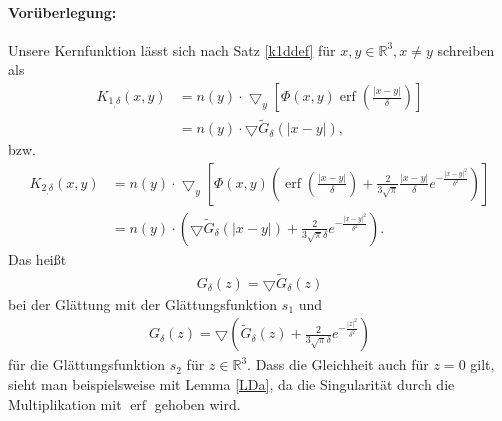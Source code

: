 \documentclass[12pt,a4paper]{scrartcl}
\newtheorem{Lemma}[Satz]{Lemma}
\newcommand{\dd}{\mathrm{d}}
\numberwithin{equation}{section}
\newcommand{\R}{\mathbb{R}} %
\newcommand{\F}{\mathcal{F}} %
\newcommand{\grad}{\bigtriangledown}
\newcommand{\erf}{\operatorname{erf}}
\newcommand{\erfc}{\operatorname{erfc}}
\begin{document}
\paragraph{Vorüberlegung:} Unsere Kernfunktion lässt sich nach Satz \ref{k1ddef} für $x,y \in \R^3, x \neq y$ schreiben als
\begin{align*}
K_{1_,\delta}(x,y) &= n(y) \cdot \grad_y \left[ \Phi (x,y) \erf \left(\frac{|x-y|}{\delta}\right) \right] \\
&= n(y) \cdot \grad \widetilde G_\delta( |x-y|),
\end{align*} bzw. 
\begin{align*}
K_{2_,\delta}(x,y) &=  n(y) \cdot \grad_y \left[ \Phi (x,y) (\erf \left(\frac{|x-y|}{\delta}\right) +\frac{2}{3\sqrt{\pi}}\frac{|x-y|}{\delta}e^{-\frac{|x-y|^2}{\delta^2}}) \right] \\
&=n(y) \cdot  \left( \grad \widetilde G_\delta( |x-y|) + \frac{2}{3 \sqrt{\pi} \delta } e^{-\frac{|x-y|^2}{\delta^2}}\right).
\end{align*}
Das heißt \begin{align}
G_{\delta}(z)= \grad \widetilde G_\delta(z)
\end{align}
 bei der Glättung mit der Glättungsfunktion $s_1$ und 
\begin{align} \label{EqGdeltas2}
G_{\delta}(z) = \grad \left(\widetilde G_\delta(z) + \frac{2}{3 \sqrt{\pi} \delta } e^{-\frac{|z|^2}{\delta^2}} \right)
\end{align}
für die Glättungsfunktion $s_2$ für $z \in \R^3$. Dass die Gleichheit auch für $z=0$ gilt, sieht man beispielsweise mit Lemma \ref{LDa}, da die Singularität durch die Multiplikation mit $\erf$ gehoben wird.
\end{document}
